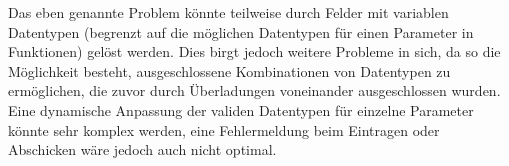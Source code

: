 Das eben genannte Problem könnte teilweise durch Felder mit variablen Datentypen (begrenzt auf die möglichen Datentypen für einen Parameter in Funktionen) gelöst werden. Dies birgt jedoch weitere Probleme in sich, da so die Möglichkeit besteht, ausgeschlossene Kombinationen von Datentypen zu ermöglichen, die zuvor durch Überladungen voneinander ausgeschlossen wurden. Eine dynamische Anpassung der validen Datentypen für einzelne Parameter könnte sehr komplex werden, eine Fehlermeldung beim Eintragen oder Abschicken wäre jedoch auch nicht optimal.

